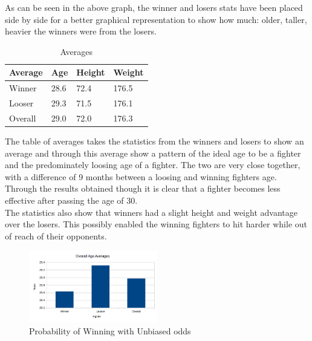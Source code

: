 \documentclass{article}
\begin{document}
As can be seen in the above graph, the winner and losers stats have been placed side by side for a better graphical representation to show how much: older, taller, heavier the winners were from the losers. 

\begin{table}[H]
\centering
\caption{Averages}
\label{my-label}
\begin{tabular}{|l|l|l|l|}
\hline
Average & Age  & Height & Weight \\ \hline
Winner  & 28.6 & 72.4   & 176.5  \\ \hline
Looser  & 29.3 & 71.5   & 176.1  \\ \hline
Overall & 29.0 & 72.0   & 176.3  \\ \hline
\end{tabular}
\end{table}
The table of averages takes the statistics from the winners and losers to show an average and through this average show a pattern of the ideal age to be a fighter and the predominately loosing age of a fighter. The two are very close together, with a difference of 9 months between a loosing and winning fighters age. Through the results obtained though it is clear that a fighter becomes less effective after passing the age of 30.\\
The statistics also show that winners had a slight height and weight advantage over the losers. This possibly enabled the winning fighters to hit harder while out of reach of their opponents.




\begin{figure}[H]
\centering
\includegraphics[width=0.5\textwidth]{a1.png}
\caption{Probability of Winning with Unbiased odds}
\end{figure}
\end{document}

